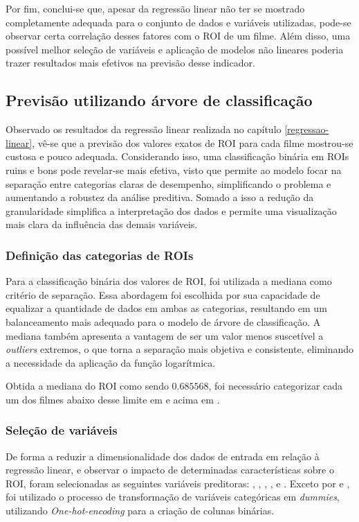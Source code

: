 Por fim, conclui-se que, apesar da regressão linear não ter se mostrado completamente adequada para o conjunto de dados e variáveis utilizadas, pode-se observar certa correlação desses fatores com o \acrshort{ROI} de um filme. Além disso, uma possível melhor seleção de variáveis e aplicação de modelos não lineares poderia trazer resultados mais efetivos na previsão desse indicador.

\subsection{Previsão utilizando árvore de classificação}
Observado os resultados da regressão linear realizada no capítulo \ref{regressao-linear}, vê-se que a previsão dos valores exatos de \acrshort{ROI} para cada filme mostrou-se custosa e pouco adequada. Considerando isso, uma classificação binária em \acrshort{ROI}s ruins e bons pode revelar-se mais efetiva, visto que permite ao modelo focar na separação entre categorias claras de desempenho, simplificando o problema e aumentando a robustez da análise preditiva. Somado a isso a redução da granularidade simplifica a interpretação dos dados e permite uma visualização mais clara da influência das demais variáveis.

\subsubsection{Definição das categorias de \acrshort{ROI}s}
Para a classificação binária dos valores de \acrshort{ROI}, foi utilizada a mediana como critério de separação. Essa abordagem foi escolhida por sua capacidade de equalizar a quantidade de dados em ambas as categorias, resultando em um balanceamento mais adequado para o modelo de árvore de classificação. A mediana também apresenta a vantagem de ser um valor menos suscetível a \textit{outliers} extremos, o que torna a separação mais objetiva e consistente, eliminando a necessidade da aplicação da função logarítmica.

Obtida a mediana do \acrshort{ROI} como sendo  $0.685568$, foi necessário categorizar cada um dos filmes abaixo desse limite em  e acima em . 

\subsubsection{Seleção de variáveis}
De forma a reduzir a dimensionalidade dos dados de entrada em relação à regressão linear, e observar o impacto de determinadas características sobre o \acrshort{ROI}, foram selecionadas as seguintes variáveis preditoras: , , , ,  e . Exceto por  e , foi utilizado o processo de transformação de variáveis categóricas em \textit{dummies}, utilizando \textit{One-hot-encoding} para a criação de colunas binárias.

